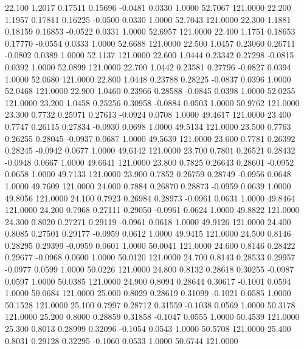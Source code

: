   22.100   1.2017   0.17511   0.15696  -0.0481   0.0330   1.0000  52.7067 121.0000
  22.200   1.1957   0.17811   0.16225  -0.0500   0.0330   1.0000  52.7043 121.0000
  22.300   1.1881   0.18159   0.16853  -0.0522   0.0331   1.0000  52.6957 121.0000
  22.400   1.1751   0.18653   0.17770  -0.0554   0.0333   1.0000  52.6688 121.0000
  22.500   1.0457   0.23060   0.26711  -0.0802   0.0389   1.0000  52.1137 121.0000
  22.600   1.0444   0.23342   0.27298  -0.0815   0.0392   1.0000  52.0899 121.0000
  22.700   1.0442   0.23581   0.27796  -0.0827   0.0394   1.0000  52.0680 121.0000
  22.800   1.0448   0.23788   0.28225  -0.0837   0.0396   1.0000  52.0468 121.0000
  22.900   1.0460   0.23966   0.28588  -0.0845   0.0398   1.0000  52.0255 121.0000
  23.200   1.0458   0.25256   0.30958  -0.0884   0.0503   1.0000  50.9762 121.0000
  23.300   0.7732   0.25971   0.27613  -0.0924   0.0708   1.0000  49.4617 121.0000
  23.400   0.7747   0.26115   0.27834  -0.0930   0.0698   1.0000  49.5134 121.0000
  23.500   0.7763   0.26255   0.28045  -0.0937   0.0687   1.0000  49.5639 121.0000
  23.600   0.7781   0.26392   0.28245  -0.0942   0.0677   1.0000  49.6142 121.0000
  23.700   0.7801   0.26521   0.28432  -0.0948   0.0667   1.0000  49.6641 121.0000
  23.800   0.7825   0.26643   0.28601  -0.0952   0.0658   1.0000  49.7133 121.0000
  23.900   0.7852   0.26759   0.28749  -0.0956   0.0648   1.0000  49.7609 121.0000
  24.000   0.7884   0.26870   0.28873  -0.0959   0.0639   1.0000  49.8056 121.0000
  24.100   0.7923   0.26984   0.28973  -0.0961   0.0631   1.0000  49.8464 121.0000
  24.200   0.7968   0.27111   0.29050  -0.0961   0.0624   1.0000  49.8822 121.0000
  24.300   0.8020   0.27271   0.29119  -0.0961   0.0618   1.0000  49.9126 121.0000
  24.400   0.8085   0.27501   0.29177  -0.0959   0.0612   1.0000  49.9415 121.0000
  24.500   0.8146   0.28295   0.29399  -0.0959   0.0601   1.0000  50.0041 121.0000
  24.600   0.8146   0.28422   0.29677  -0.0968   0.0600   1.0000  50.0120 121.0000
  24.700   0.8143   0.28533   0.29957  -0.0977   0.0599   1.0000  50.0226 121.0000
  24.800   0.8132   0.28618   0.30255  -0.0987   0.0597   1.0000  50.0385 121.0000
  24.900   0.8094   0.28644   0.30617  -0.1001   0.0594   1.0000  50.0684 121.0000
  25.000   0.8029   0.28619   0.31099  -0.1021   0.0585   1.0000  50.1528 121.0000
  25.100   0.7997   0.28712   0.31559  -0.1038   0.0569   1.0000  50.3178 121.0000
  25.200   0.8000   0.28859   0.31858  -0.1047   0.0555   1.0000  50.4539 121.0000
  25.300   0.8013   0.28999   0.32096  -0.1054   0.0543   1.0000  50.5708 121.0000
  25.400   0.8031   0.29128   0.32295  -0.1060   0.0533   1.0000  50.6744 121.0000
